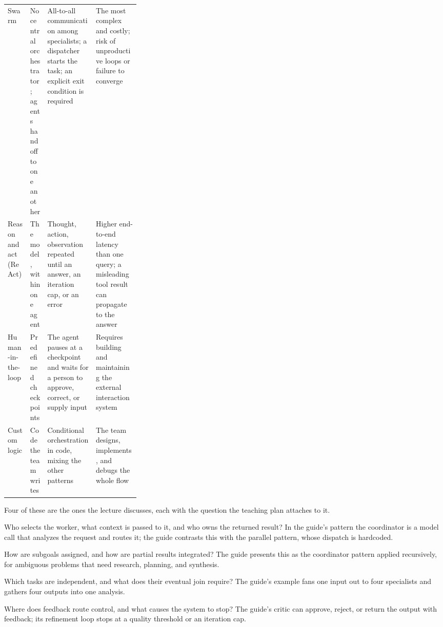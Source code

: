 \begin{table}[tbp]
\begin{adjustbox}{width=\linewidth}
\begin{tabularx}{\linewidth}{L{0.17\linewidth}L{0.13\linewidth}XX}
    Swarm & No central orchestrator; agents hand off to one another & All-to-all communication among specialists; a dispatcher starts the task; an explicit exit condition is required & The most complex and costly; risk of unproductive loops or failure to converge \\
    Reason and act (ReAct) & The model, within one agent & Thought, action, observation repeated until an answer, an iteration cap, or an error & Higher end-to-end latency than one query; a misleading tool result can propagate to the answer \\
    Human-in-the-loop & Predefined checkpoints & The agent pauses at a checkpoint and waits for a person to approve, correct, or supply input & Requires building and maintaining the external interaction system \\
    Custom logic & Code the team writes & Conditional orchestration in code, mixing the other patterns & The team designs, implements, and debugs the whole flow \\
    \bottomrule
  \end{tabularx}\end{adjustbox}
\end{table}

Four of these are the ones the lecture discusses, each with the question the teaching plan
attaches to it.

\begin{description}[style=nextline]
  \item[Coordinator and specialist routing.] Who selects the worker, what context is passed
  to it, and who owns the returned result? In the guide's pattern the coordinator is a
  model call that analyzes the request and routes it; the guide contrasts this with the
  parallel pattern, whose dispatch is hardcoded.
  \item[Hierarchical task decomposition.] How are subgoals assigned, and how are partial
  results integrated? The guide presents this as the coordinator pattern applied
  recursively, for ambiguous problems that need research, planning, and synthesis.
  \item[Parallel work.] Which tasks are independent, and what does their eventual join
  require? The guide's example fans one input out to four specialists and gathers four
  outputs into one analysis.
  \item[Review and critique, and iterative refinement.] Where does feedback route control,
  and what causes the system to stop? The guide's critic can approve, reject, or return
  the output with feedback; its refinement loop stops at a quality threshold or an
  iteration cap.
\end{description}

